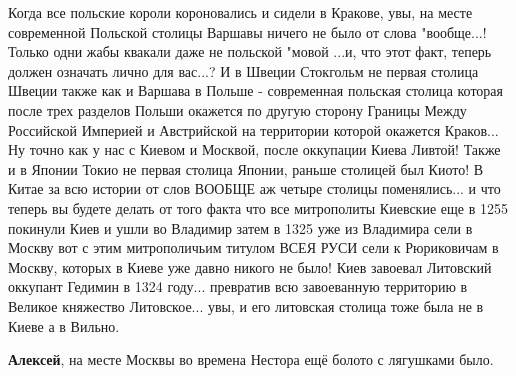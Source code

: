 \begin{itemize}
\begin{itemize}
Когда все польские короли короновались и сидели в Кракове, увы, на месте
современной Польской столицы Варшавы ничего не было от слова "вообще...! Только
одни жабы квакали даже не польской "мовой ...и, что этот факт, теперь должен
означать лично для вас...? И в Швеции Стокгольм не первая столица Швеции также
как и Варшава в Польше - современная польская столица которая после трех
разделов Польши окажется по другую сторону Границы Между Российской Империей и
Австрийской на территории которой окажется Краков... Ну точно как у нас с
Киевом и Москвой, после оккупации Киева Ливтой! Также и в Японии Токио не
первая столица Японии, раньше столицей был Киото! В Китае за всю истории от
слов ВООБЩЕ аж четыре столицы поменялись... и что теперь вы будете делать от
того факта что все митрополиты Киевские еще в 1255 покинули Киев и ушли во
Владимир затем в 1325 уже из Владимира сели в Москву вот с этим митрополичьим
титулом ВСЕЯ РУСИ сели к Рюриковичам в Москву, которых в Киеве уже давно никого
не было! Киев завоевал Литовский оккупант Гедимин в 1324 году... превратив всю
завоеванную территорию в Великое княжество Литовское... увы, и его литовская
столица тоже была не в Киеве а в Вильно.

\textbf{Алексей}, на месте Москвы во времена Нестора ещё болото с лягушками было.

\end{itemize} %

\end{itemize} %
